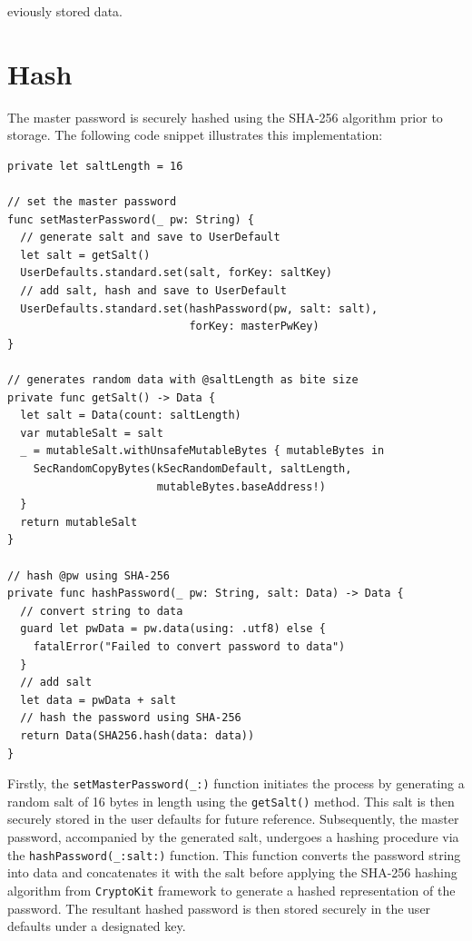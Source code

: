 \documentclass[10pt, titlepage]{article}
\begin{document}
eviously stored data.

\section*{Hash}
The master password is securely hashed using the SHA-256 algorithm prior to storage. The following code snippet illustrates this implementation:
\begin{center}
\begin{minipage}{\textwidth}
\begin{lstlisting}
private let saltLength = 16

// set the master password
func setMasterPassword(_ pw: String) {
  // generate salt and save to UserDefault
  let salt = getSalt()
  UserDefaults.standard.set(salt, forKey: saltKey)
  // add salt, hash and save to UserDefault
  UserDefaults.standard.set(hashPassword(pw, salt: salt), 
                            forKey: masterPwKey)
}
  
// generates random data with @saltLength as bite size
private func getSalt() -> Data {
  let salt = Data(count: saltLength)
  var mutableSalt = salt
  _ = mutableSalt.withUnsafeMutableBytes { mutableBytes in
    SecRandomCopyBytes(kSecRandomDefault, saltLength, 
                       mutableBytes.baseAddress!)
  }
  return mutableSalt
}
  
// hash @pw using SHA-256
private func hashPassword(_ pw: String, salt: Data) -> Data {
  // convert string to data
  guard let pwData = pw.data(using: .utf8) else {
    fatalError("Failed to convert password to data")
  }
  // add salt
  let data = pwData + salt
  // hash the password using SHA-256
  return Data(SHA256.hash(data: data))
}
\end{lstlisting}
\end{minipage}
\end{center}

Firstly, the \texttt{setMasterPassword(\_:)} function initiates the process by generating a random salt of 16 bytes in length using the \texttt{getSalt()} method. This salt is then securely stored in the user defaults for future reference. Subsequently, the master password, accompanied by the generated salt, undergoes a hashing procedure via the \texttt{hashPassword(\_:salt:)} function. This function converts the password string into data and concatenates it with the salt before applying the SHA-256 hashing algorithm from \texttt{CryptoKit} framework to generate a hashed representation of the password. The resultant hashed password is then stored securely in the user defaults under a designated key.
\end{document}
